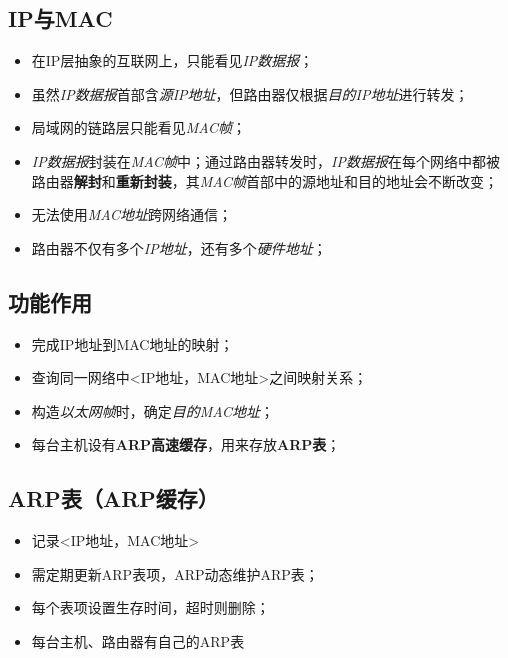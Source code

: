 \subsection{IP与MAC}
\begin{itemize}
    \item 在IP层抽象的互联网上，只能看见\textit{IP数据报}；
    \item 虽然\textit{IP数据报}首部含\textit{源IP地址}，但路由器仅根据\textit{目的IP地址}进行转发；
    \item 局域网的链路层只能看见\textit{MAC帧}；
    \item \textit{IP数据报}封装在\textit{MAC帧}中；通过路由器转发时，\textit{IP数据报}在每个网络中都被路由器\textbf{解封}和\textbf{重新封装}，其\textit{MAC帧}首部中的源地址和目的地址会不断改变；
    \item 无法使用\textit{MAC地址}跨网络通信；
    \item 路由器不仅有多个\textit{IP地址}，还有多个\textit{硬件地址}；
\end{itemize}


\subsection{功能作用}
\begin{itemize}
    \item 完成IP地址到MAC地址的映射；
    \item 查询同一网络中<IP地址，MAC地址>之间映射关系；
    \item 构造\textit{以太网帧}时，确定\textit{目的MAC地址}；
    \item 每台主机设有\textbf{ARP高速缓存}，用来存放\textbf{ARP表}；
\end{itemize}


\subsection{ARP表（ARP缓存）}
\begin{itemize}
    \item 记录<IP地址，MAC地址>
    \item 需定期更新ARP表项，ARP动态维护ARP表；
    \item 每个表项设置生存时间，超时则删除；
    \item 每台主机、路由器有自己的ARP表
\end{itemize}


